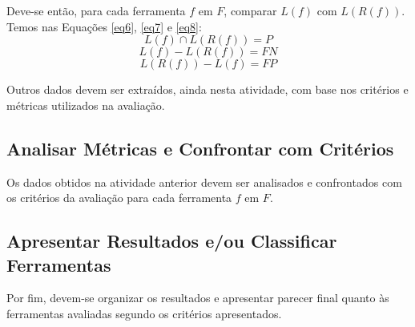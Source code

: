 Deve-se então, para cada ferramenta $f$ em $F$, comparar $L(f)$ com $L(R(f))$. Temos nas Equações \eqref{eq6}, \eqref{eq7} e \eqref{eq8}:
\begin{equation}\label{eq6}
  L(f) \cap L(R(f)) = P
\end{equation}
\begin{equation}\label{eq7}
  L(f) - L(R(f)) = FN
\end{equation}
\begin{equation}\label{eq8}
  L(R(f)) - L(f) = FP
\end{equation}

Outros dados devem ser extraídos, ainda nesta atividade, com base nos critérios e métricas utilizados na avaliação.

\subsection{Analisar Métricas e Confrontar com Critérios}

Os dados obtidos na atividade anterior devem ser analisados e confrontados com os critérios da avaliação para cada ferramenta $f$ em $F$.

\subsection{Apresentar Resultados e/ou Classificar Ferramentas}

Por fim, devem-se organizar os resultados e apresentar parecer final quanto às ferramentas avaliadas segundo os critérios apresentados.
